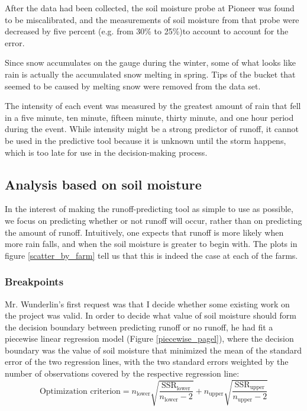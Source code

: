 \documentclass[11pt]{article}
\begin{document}
After the data had been collected, the soil moisture probe at Pioneer was found to be miscalibrated, and the measurements of soil moisture from that probe were decreased by five percent (e.g. from 30\% to 25\%)to account to account for the error. \*

Since snow accumulates on the gauge during the winter, some of what looks like rain is actually the accumulated snow melting in spring. Tips of the bucket that seemed to be caused by melting snow were removed from the data set.\*

The intensity of each event was measured by the greatest amount of rain that fell in a five minute, ten minute, fifteen minute, thirty minute, and one hour period during the event. While intensity might be a strong predictor of runoff, it cannot be used in the predictive tool because it is unknown until the storm happens, which is too late for use in the decision-making process.\*


\subsection{Analysis based on soil moisture}
In the interest of making the runoff-predicting tool as simple to use as possible, we focus on predicting whether or not runoff will occur, rather than on predicting the amount of runoff. Intuitively, one expects that runoff is more likely when more rain falls, and when the soil moisture is greater to begin with. The plots in figure \ref{scatter_by_farm} tell us that this is indeed the case at each of the farms.\*

\subsubsection{Breakpoints}
Mr. Wunderlin's first request was that I decide whether some existing work on the project was valid. In order to decide what value of soil moisture should form the decision boundary between predicting runoff or no runoff, he had fit a piecewise linear regression model (Figure \ref{piecewise_pagel}), where the decision boundary was the value of soil moisture that minimized the mean of the standard error of the two regression lines, with the two standard errors weighted by the number of observations covered by the respective regression line:
\[
\text{Optimization criterion} = n_{\text{lower}} \sqrt{\frac{\text{SSR}_{\text{lower}}}{ n_{\text{lower}} - 2}} + n_{\text{upper}} \sqrt{\frac{\text{SSR}_{\text{upper}}}{ n_{\text{upper}} - 2}}
\]
\end{document}
